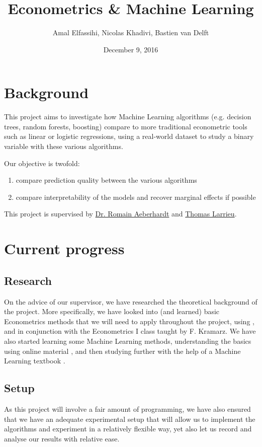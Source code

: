 \documentclass[a4paper]{article}
\begin{document}
\title{Econometrics \& Machine Learning}
\author{Amal Elfassihi, Nicolas Khadivi, Bastien van Delft}
\date{December 9, 2016}
\maketitle

\section{Background}

This project aims to investigate how Machine Learning algorithms (e.g. decision trees, random
forests, boosting) compare to more traditional econometric tools such as linear or logistic
regressions, using a real-world dataset \cite{enquete} to study a binary variable with these
various algorithms.

Our objective is twofold:
\begin{enumerate}[nosep]
    \item compare prediction quality between the various algorithms
    \item compare interpretability of the models and recover marginal effects if possible
\end{enumerate}

This project is supervised by \href{http://www.crest.fr/pagesperso.php?user=3045}{Dr. Romain Aeberhardt} and \href{http://thomas-larrieu.strikingly.com/}{Thomas Larrieu}.

\section{Current progress}
\subsection{Research}
On the advice of our supervisor, we have researched the theoretical background of the project. More specifically, we have looked into (and learned) basic Econometrics methods that we will need to apply throughout the project, using \cite{wooldridge}, and in conjunction with the Econometrics I class taught by F. Kramarz. We have also started learning some Machine Learning methods, understanding the basics using online material \cite{vidhya}, and then studying further with the help of a Machine Learning textbook \cite{introR}.

\subsection{Setup}
As this project will involve a fair amount of programming, we have also ensured that we have an adequate experimental setup that will allow us to implement the algorithms and experiment in a relatively flexible way, yet also let us record and analyse our results with relative ease.
\end{document}
